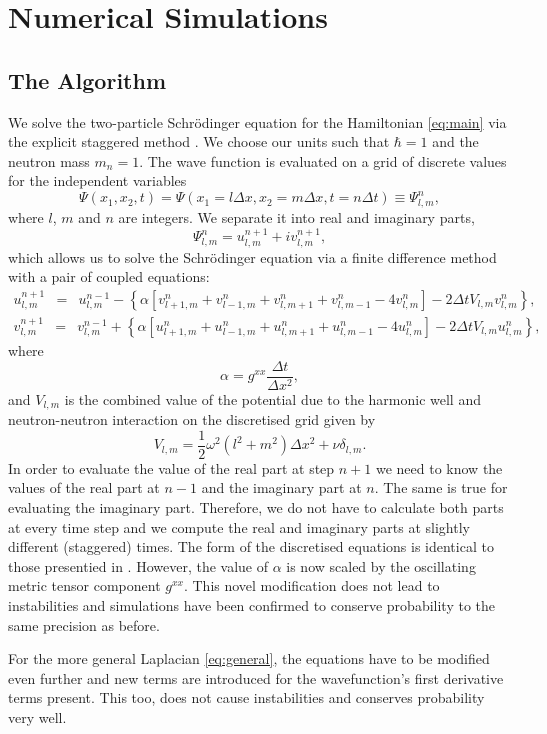 \section{Numerical Simulations}\label{sec:numerical}

\subsection{The Algorithm}

We solve the two-particle Schr\"{o}dinger equation for the Hamiltonian
\eqref{eq:main} via the explicit staggered method \cite{numerics}. We
choose our units such that $\hbar = 1$ and the neutron mass $m_n =
1$. The wave function is evaluated on a grid of discrete values for
the independent variables
\begin{equation}
\Psi(x_1, x_2, t) = \Psi(x_1 = l\Delta x, x_2 = m\Delta x, t = n\Delta
t) \equiv \Psi^n_{l, m},
\end{equation}
where $l$, $m$ and $n$ are integers. We separate it into real and
imaginary parts,
\begin{equation}
\Psi^n_{l,m} = u^{n+1}_{l,m} + iv^{n+1}_{l,m},
\end{equation}
which allows us to solve the Schr\"{o}dinger equation via a finite
difference method with a pair of coupled equations:
\begin{equation}
\begin{array} {lcl}
u^{n+1}_{l,m} & = & u^{n-1}_{l,m} - \left\{ \alpha \left[ v^n_{l+1,m}
  + v^n_{l-1,m} + v^n_{l,m+1} + v^n_{l,m-1} - 4v^n_{l,m} \right] - 2
\Delta t V_{l,m}v^n_{l,m} \right\} ,
\end{array}
\end{equation}
\begin{equation}
\begin{array} {lcl}
v^{n+1}_{l,m} & = & v^{n-1}_{l,m} + \left\{ \alpha \left[ u^n_{l+1,m}
  + u^n_{l-1,m} + u^n_{l,m+1} + u^n_{l,m-1} - 4u^n_{l,m} \right] - 2
\Delta t V_{l,m}u^n_{l,m} \right\},
\end{array}
\end{equation}
where 
\begin{equation}
\alpha = g^{xx}\frac{\Delta t}{\Delta x^2},
\end{equation}
and $V_{l,m}$ is the combined value of the potential due to the
harmonic well and neutron-neutron interaction on the discretised
grid given by
\begin{equation}
V_{l,m} = \frac{1}{2}\omega^2(l^2 + m^2)\Delta x^2 + \nu\delta_{l,m}.
\end{equation}
In order to evaluate the value of the real part at step $n+1$ we need
to know the values of the real part at $n-1$ and the imaginary part at
$n$. The same is true for evaluating the imaginary part. Therefore, we
do not have to calculate both parts at every time step and we compute
the real and imaginary parts at slightly different (staggered)
times. The form of the discretised equations is identical to those
presentied in \cite{numerics}. However, the value of $\alpha$ is now
scaled by the oscillating metric tensor component $g^{xx}$. This novel
modification does not lead to instabilities and simulations have been
confirmed to conserve probability to the same precision as before.

For the more general Laplacian \eqref{eq:general}, the equations have to
be modified even further and new terms are introduced for the
wavefunction's first derivative terms present. This too, does not
cause instabilities and conserves probability very well.
